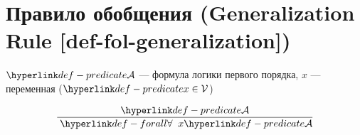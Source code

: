 
\section{Правило обобщения (Generalization Rule [def-fol-generalization])}

\hypertarget{def-fol-generalization}{}
\begin{definition}
\label{entity:def-fol-generalization}
$\Predicate{\mathcal{A}}$ --- формула логики первого порядка,
$x$ --- переменная ($\Predicate{x} \in \mathcal{V}$)

\[
\frac{\Predicate{\mathcal{A}}}{\TerForall x \Predicate{\mathcal{A}}}
\]
\end{definition}